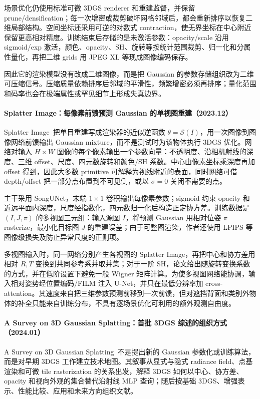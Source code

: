场景优化仍使用标准可微 3DGS renderer 和重建监督，并保留 prune/densification；每一次增密或裁剪破坏网格邻域后，都会重新排序以恢复二维局部结构。空间坐标还采用可逆的对数式 contraction，使无界坐标在中心附近保留更高相对精度。训练结束后存储的是未激活参数：opacity/scale 沿用 sigmoid/exp 激活，颜色、opacity、SH、旋转等按统计范围裁剪、归一化和分属性量化，再把二维 grids 用 JPEG XL 等现成图像编码保存。

因此它的渲染模型没有改成二维图像，而是把 Gaussian 的参数存储组织改为二维可压缩信号。压缩质量依赖排序后邻域的平滑性，频繁增密必须再排序；量化范围和码率也会在极端属性或罕见细节上形成失真边界。


\paragraph{Splatter Image：每像素前馈预测 Gaussian 的单视图重建（2023.12）}
Splatter Image~\cite{2312_13150}把单目重建写成渲染器的近似逆函数 $\theta=\mathcal S(I)$，用一次图像到图像网络前馈输出 Gaussian mixture，而不是测试时为该物体执行 3DGS 优化。网络对输入 $H\times W$ 图像的每个像素输出一个参数向量：不透明度、沿相机射线的深度、三维 offset、尺度、四元数旋转和颜色/SH 系数。中心由像素坐标乘深度再加 offset 得到，因此大多数 primitive 可解释为视线附近的表面，同时网络可借 depth/offset 把一部分点布置到不可见侧，或以 $\sigma=0$ 关闭不需要的点。

主干采用 SongUNet，末端 $1\times1$ 卷积输出每像素参数；sigmoid 约束 opacity 和近远平面内深度，尺度经指数化，四元数归一化后构造正定协方差。训练数据是 $(I,J,\pi)$ 的多视图三元组：输入源图 $I$，将预测 Gaussian 用相对位姿 $\pi$ rasterize，最小化目标图 $J$ 的重建误差；由于可整图渲染，作者还使用 LPIPS 等图像级损失及防止异常尺度的正则项。

多视图输入时，同一网络分别产生各视图的 Splatter Image，再把中心和协方差用相对 $R,T$ 变换到共同参考系并取并集；对于一阶 SH，论文给出随旋转变换系数的方式，并在低阶设置下避免一般 Wigner 矩阵计算。为使多视图网络能协调，输入相对姿势经位置编码/FILM 注入 U-Net，并只在最低分辨率加 cross-attention。其速度来自把三维参数预测前移到一次前馈，但对遮挡背面和类别外物体的补全只能来自训练分布，不具有逐场景优化可利用的额外观测自由度。


\paragraph{A Survey on 3D Gaussian Splatting：首批 3DGS 综述的组织方式（2024.01）}
A Survey on 3D Gaussian Splatting~\cite{2401_03890}不是提出新的 Gaussian 参数化或训练算法，而是对早期 3DGS 工作建立技术地图。其叙事从显式与隐式 radiance field、点基渲染和可微 tile rasterization 的关系出发，解释 3DGS 如何以中心、协方差、opacity 和视向外观的集合替代沿射线 MLP 查询；随后按基础 3DGS、增强表示、性能比较、应用和未来方向组织文献。

